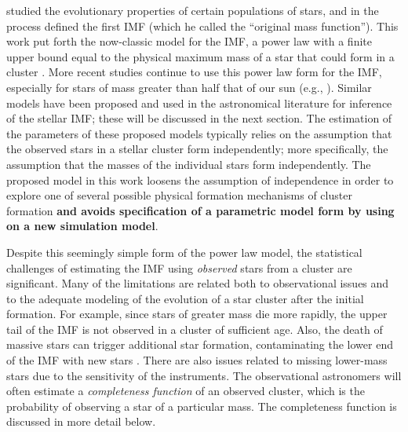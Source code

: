 \documentclass[ejs]{imsart}
\numberwithin{equation}{section}
\theoremstyle{plain}
\newcommand{\new}[1]{{\bf #1}}
\begin{document}
\cite{salpeter55} studied the evolutionary properties of certain 
populations of stars, and in the process defined the first IMF 
(which he called the ``original mass function'').  
This work put forth the now-classic model for the IMF, a power law 
with a finite upper bound equal to the physical maximum mass of a star that 
could form in a cluster \citep{salpeter55}.  
More recent studies continue to use this power law form for the IMF, especially for stars of mass greater than half that
of our sun (e.g., \citealt{Massey2003, bastian2010, DaRioEtAl2012, Lim2013, weisz13, Weisz:2015kx, Jose2017}).
Similar models have been proposed and used in the astronomical literature for inference of the 
stellar IMF; these will be discussed in the next section. 
The estimation of the parameters of these proposed models typically relies on the assumption that 
the observed stars in a stellar cluster form independently; more specifically, the assumption that the masses of the individual stars form independently. 
The proposed model in this work loosens the assumption of independence in order to explore one of several possible physical formation 
mechanisms of cluster formation\new{ and avoids specification of a parametric model form by using on a new simulation model}.

Despite this seemingly simple form of the power law model, the statistical challenges of estimating the 
IMF using \emph{observed} stars from a cluster are significant. Many of the limitations are related 
both to 
observational issues and to the adequate modeling of the evolution of a star cluster after the 
initial formation. For example, since stars of greater mass die more rapidly, the upper tail of the IMF is 
not observed in a cluster of sufficient age.  
Also, the death of massive stars can trigger additional star formation,
contaminating the lower end of the IMF with new stars \citep{Woosley2015}.
There are also issues related to missing lower-mass stars due to the sensitivity of the instruments.  
The observational astronomers will often estimate a \emph{completeness function} of an observed 
cluster, which is the probability of observing a star of a particular mass.  The completeness 
function is discussed in more detail below.
\end{document}
